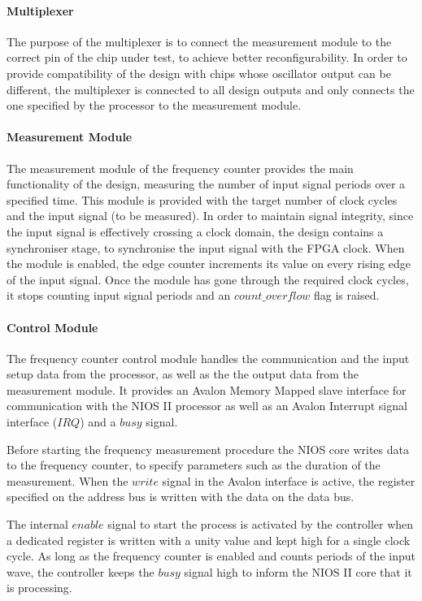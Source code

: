 \paragraph{Multiplexer}
The purpose of the multiplexer is to connect the measurement module to the correct pin of the chip under test, to achieve better reconfigurability. In order to provide compatibility of the design with chips whose oscillator output can be different, the multiplexer is connected to all design outputs and only connects the one specified by the processor to the measurement module.

\paragraph{Measurement Module}
The measurement module of the frequency counter provides the main functionality of the design, measuring the number of input signal periods over a specified time. This module is provided with the target number of clock cycles and the input signal (to be measured). In order to maintain signal integrity, since the input signal is effectively crossing a clock domain, the design contains a synchroniser stage, to synchronise the input signal with the FPGA clock. When the module is enabled, the edge counter increments its value on every rising edge of the input signal. Once the module has gone through the required clock cycles, it stops counting input signal periods and an $count\_overflow$ flag is raised.


\paragraph{Control Module}
The frequency counter control module handles the communication and the input setup data from the processor, as well as the the output data from the measurement module. It provides an Avalon Memory Mapped slave interface for communication with the NIOS II processor as well as an Avalon Interrupt signal interface ($IRQ$) and a $busy$ signal.

Before starting the frequency measurement procedure the NIOS core writes data to the frequency counter, to specify parameters such as the duration of the measurement. When the $write$ signal in the Avalon interface is active, the register specified on the address bus is written with the data on the data bus.

The internal $enable$ signal to start the process is activated by the controller when a dedicated register is written with a unity value and kept high for a single clock cycle. As long as the frequency counter is enabled and counts periods of the input wave, the controller keeps the $busy$ signal high to inform the NIOS II core that it is processing.

